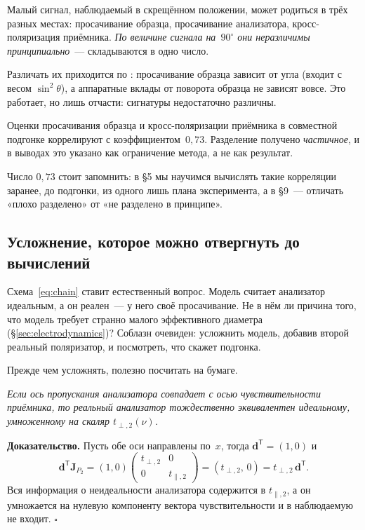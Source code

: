 \begin{warning}
Малый сигнал, наблюдаемый в скрещённом положении, может родиться в трёх разных местах:
просачивание образца, просачивание анализатора, кросс-поляризация приёмника. \emph{По величине
сигнала на~$90^\circ$ они неразличимы принципиально}~--- складываются в одно число.

Различать их приходится по : просачивание образца зависит от угла (входит
с весом $\sin^2\theta$), а аппаратные вклады от поворота образца не зависят вовсе. Это работает,
но лишь отчасти: сигнатуры недостаточно различны.
\end{warning}

\begin{example}
Оценки просачивания образца и кросс-поляризации приёмника в совместной подгонке коррелируют с
коэффициентом~$0{,}73$. Разделение получено \emph{частичное}, и в выводах это указано как
ограничение метода, а не как результат.

Число $0{,}73$ стоит запомнить: в §5 мы научимся вычислять такие корреляции заранее, до
подгонки, из одного лишь плана эксперимента, а в §9~--- отличать «плохо разделено» от «не
разделено в принципе».
\end{example}

\subsection{Усложнение, которое можно отвергнуть до вычислений}
\label{subsec:alignment}

Схема~\eqref{eq:chain} ставит естественный вопрос. Модель считает анализатор идеальным, а он
реален~--- у него своё просачивание. Не в нём ли причина того, что модель требует странно
малого эффективного диаметра (§\ref{sec:electrodynamics})? Соблазн очевиден: усложнить модель,
добавив второй реальный поляризатор, и посмотреть, что скажет подгонка.

Прежде чем усложнять, полезно посчитать на бумаге.

\begin{strict}
\emph{Если ось пропускания анализатора совпадает с осью чувствительности приёмника, то реальный
анализатор тождественно эквивалентен идеальному, умноженному на скаляр $t_{\perp,2}(\nu)$.}

\smallskip
\textbf{Доказательство.} Пусть обе оси направлены по~$x$, тогда $\mathbf{d}^{\mathsf T}=(1,0)$ и
\[
  \mathbf{d}^{\mathsf T}\mathbf{J}_{P_2}
  =(1,0)\begin{pmatrix}t_{\perp,2}&0\\[2pt]0&t_{\parallel,2}\end{pmatrix}
  =(t_{\perp,2},\,0)
  =t_{\perp,2}\,\mathbf{d}^{\mathsf T}.
\]
Вся информация о неидеальности анализатора содержится в $t_{\parallel,2}$, а он умножается на
нулевую компоненту вектора чувствительности и в наблюдаемую не входит. $\square$
\end{strict}

